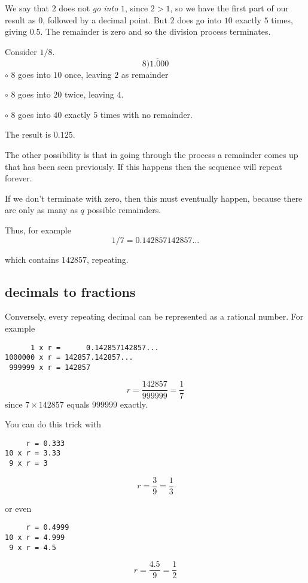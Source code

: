 \documentclass[11pt, oneside]{article}
\begin{document}
We say that $2$ does not \emph{go into} $1$, since $2 > 1$, so we have the first part of our result as $0$, followed by a decimal point.  But $2$ does go into $10$ exactly $5$ times, giving $0.5$.  The remainder is zero and so the division process terminates.

Consider $1/8$.
\[ 8 \overline{)1.000} \]
$\circ$  $8$ goes into $10$ once, leaving $2$ as remainder

$\circ$  $8$ goes into $20$ twice, leaving $4$.  

$\circ$  $8$ goes into $40$ exactly $5$ times with no remainder.

The result is $0.125$.

The other possibility is that in going through the process a remainder comes up that has been seen previously.  If this happens then the sequence will repeat forever.

If we don't terminate with zero, then this must eventually happen, because there are only as many as $q$ possible remainders.

Thus, for example
\[ 1/7 = 0.142857142857 \dots \]

which contains $142857$, repeating.

\subsection*{decimals to fractions}

Conversely, every repeating decimal can be represented as a rational number.  For example

\begin{verbatim}
      1 x r =      0.142857142857...
1000000 x r = 142857.142857...
 999999 x r = 142857
\end{verbatim}

\[ r = \frac{142857}{999999} = \frac{1}{7} \]
since $7 \times 142857$ equals $999999$ exactly.

You can do this trick with 

\begin{verbatim}
     r = 0.333
10 x r = 3.33
 9 x r = 3
\end{verbatim}

\[ r = \frac{3}{9} = \frac{1}{3} \]

or even

\begin{verbatim}
     r = 0.4999
10 x r = 4.999
 9 x r = 4.5
\end{verbatim}

\[ r = \frac{4.5}{9} = \frac{1}{2} \]
\end{document}
